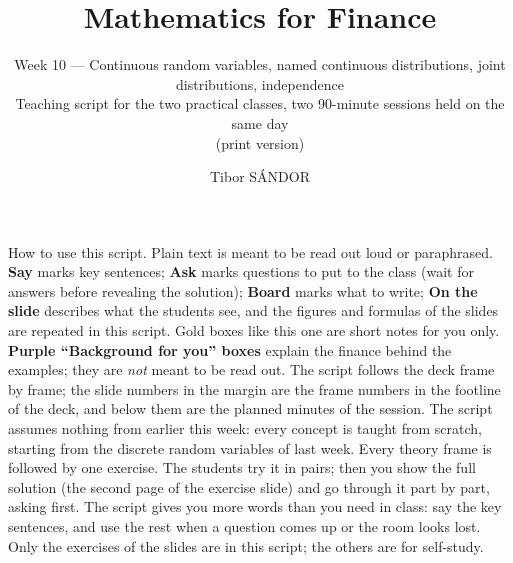 \documentclass[11pt,a4paper,parskip=half]{scrartcl}
\title{Mathematics for Finance}
\subtitle{Week 10 --- Continuous random variables, named continuous
  distributions, joint distributions, independence\\[2pt]
  \normalsize Teaching script for the two practical classes, two 90-minute
  sessions held on the same day\ifdefined\scriptprint\\[2pt]
  (print version)\fi}
\author{Tibor SÁNDOR\\[2pt]
  \normalsize\href{mailto:\myemail}{\texttt{\myemail}}}
\begin{document}
\maketitle

\begin{printskip}
	\begin{cue}
		How to use this script. Plain text is meant to be read out loud or
		paraphrased. \textbf{Say} marks key sentences; \textbf{Ask} marks
		questions to put to the class (wait for answers before revealing the
		solution); \textbf{Board} marks what to write; \textbf{On the slide}
		describes what the students see, and the figures and formulas of the
		slides are repeated in this script. Gold boxes like this one are short
		notes for you only. \textbf{Purple ``Background for you'' boxes}
		explain the finance behind the examples; they are \emph{not} meant to
		be read out. The script follows the deck frame by frame; the slide
		numbers in the margin are the frame numbers in the footline of the
		deck, and below them are the planned minutes of the session. The
		script assumes nothing from earlier this week: every concept is taught
		from scratch, starting from the discrete random variables of last
		week. Every theory frame is followed by one exercise. The students try
		it in pairs; then you show the full solution (the second page of the
		exercise slide) and go through it part by part, asking first. The
		script gives you more words than you need in class: say the key
		sentences, and use the rest when a question comes up or the room looks
		lost. Only the exercises of the slides are in this script; the others
		are for self-study.
	\end{cue}
\end{printskip}
\end{document}
